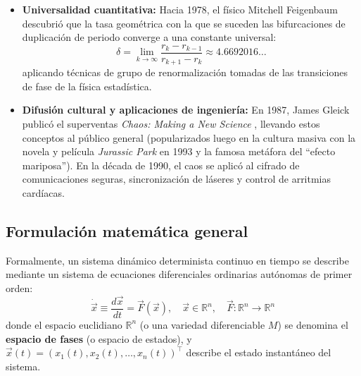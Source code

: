\begin{itemize}
    \item \textbf{Universalidad cuantitativa:} Hacia 1978, el físico Mitchell Feigenbaum \cite{feigenbaum1978} descubrió que la tasa geométrica con la que se suceden las bifurcaciones de duplicación de periodo converge a una constante universal:
    \begin{equation}
        \delta = \lim_{k \to \infty} \frac{r_k - r_{k-1}}{r_{k+1} - r_k} \approx 4.6692016\dots
    \end{equation}
    aplicando técnicas de grupo de renormalización tomadas de las transiciones de fase de la física estadística.
    \item \textbf{Difusión cultural y aplicaciones de ingeniería:} En 1987, James Gleick publicó el superventas \emph{Chaos: Making a New Science} \cite{gleick1987}, llevando estos conceptos al público general (popularizados luego en la cultura masiva con la novela y película \emph{Jurassic Park} en 1993 y la famosa metáfora del ``efecto mariposa''). En la década de 1990, el caos se aplicó al cifrado de comunicaciones seguras, sincronización de láseres y control de arritmias cardíacas.
\end{itemize}

\subsection{Formulación matemática general}

Formalmente, un sistema dinámico determinista continuo en tiempo se describe mediante un sistema de ecuaciones diferenciales ordinarias autónomas de primer orden:
\begin{equation}
    \dot{\vec{x}} \equiv \frac{d\vec{x}}{dt} = \vec{F}(\vec{x}), \quad \vec{x} \in \mathbb{R}^n, \quad \vec{F}: \mathbb{R}^n \to \mathbb{R}^n
    \label{eq:sistema_general}
\end{equation}
donde el espacio euclidiano $\mathbb{R}^n$ (o una variedad diferenciable $M$) se denomina el \textbf{espacio de fases} (o espacio de estados), y $\vec{x}(t) = (x_1(t), x_2(t), \dots, x_n(t))^\top$ describe el estado instantáneo del sistema.

